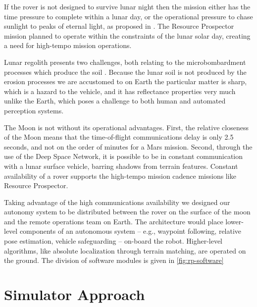 \documentclass[twocolumn,letterpaper]{IEEEAerospaceCLS}  %
\begin{document}
If the rover is not designed to survive lunar night then the mission either has the time pressure to complete within a lunar day, or the operational pressure to chase sunlight to peaks of eternal light, as proposed in \cite{otten2018strategic}.  
The Resource Prospector mission planned to operate within the constraints of the lunar solar day, creating a need for high-tempo mission operations. 

Lunar regolith presents two challenges, both relating to the microbombardment processes which produce the soil \cite{XXX}.  
Because the lunar soil is not produced by the erosion processes we are accustomed to on Earth the particular matter is sharp, which is a hazard to the vehicle, and it has reflectance properties very much unlike the Earth, which poses a challenge to both human and automated perception systems. 

The Moon is not without its operational advantages.  
First, the relative closeness of the Moon means that the time-of-flight communications delay is only 2.5 seconds, and not on the order of minutes for a Mars mission.  
Second, through the use of the Deep Space Network, it is possible to be in constant communication with a lunar surface vehicle, barring shadows from terrain features.  
Constant availability of a rover supports the high-tempo mission cadence missions like Resource Prospector.


Taking advantage of the high communications availability we designed our autonomy system to be distributed between the rover on the surface of the moon and the remote operations team on Earth.  
The architecture would place lower-level components of an autonomous system -- e.g., waypoint following, relative pose estimation, vehicle safeguarding  -- on-board the robot.  
Higher-level algorithms, like absolute localization through terrain matching, are operated on the ground.  
The division of software modules is given in \cref{fig:rp-software}



\section{Simulator Approach}
\end{document}

